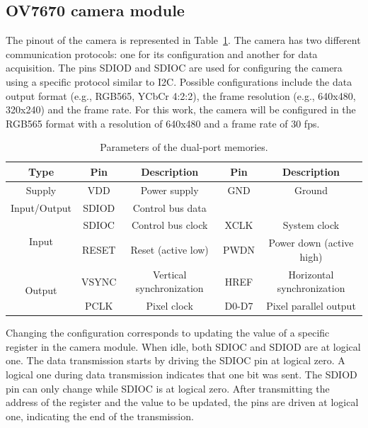 \subsection{OV7670 camera module}

The pinout of the camera is represented in Table~\ref{tab:ov7670}. The camera has two different communication protocols: one for its configuration and another for data acquisition. The pins SDIOD and SDIOC are used for configuring the camera using a specific protocol similar to I2C. Possible configurations include the data output format (e.g., RGB565, YCbCr 4:2:2), the frame resolution (e.g., 640x480, 320x240) and the frame rate. For this work, the camera will be configured in the RGB565 format with a resolution of 640x480 and a frame rate of 30 fps.

\begin{table}[!htb]
    \footnotesize
    \centering
    \caption{Parameters of the dual-port memories.}
    \label{tab:ov7670}
    \begin{tabular}{|c|c|c|c|c|}
    \hline
    Type & Pin & Description & Pin &  Description \\ \hline
    Supply & VDD & Power supply & GND & Ground \\ \hline
    Input/Output & SDIOD & Control bus data & \multicolumn{2}{c|}{} \\ \hline
    \multirow{2}{*}{Input} & SDIOC & Control bus clock & XCLK & System clock \\ \cline{2-5}
    & RESET & Reset (active low) & PWDN & Power down (active high) \\ \hline
    \multirow{2}{*}{Output} & VSYNC & Vertical synchronization & HREF & Horizontal synchronization \\ \cline{2-5}
    & PCLK & Pixel clock & D0-D7 & Pixel parallel output \\ \hline
    \end{tabular}
\end{table}

Changing the configuration corresponds to updating the value of a specific register in the camera module. When idle, both SDIOC and SDIOD are at logical one. The data transmission starts by driving the SDIOC pin at logical zero. A logical one during data transmission indicates that one bit was sent. The SDIOD pin can only change while SDIOC is at logical zero. After transmitting the address of the register and the value to be updated, the pins are driven at logical one, indicating the end of the transmission.

